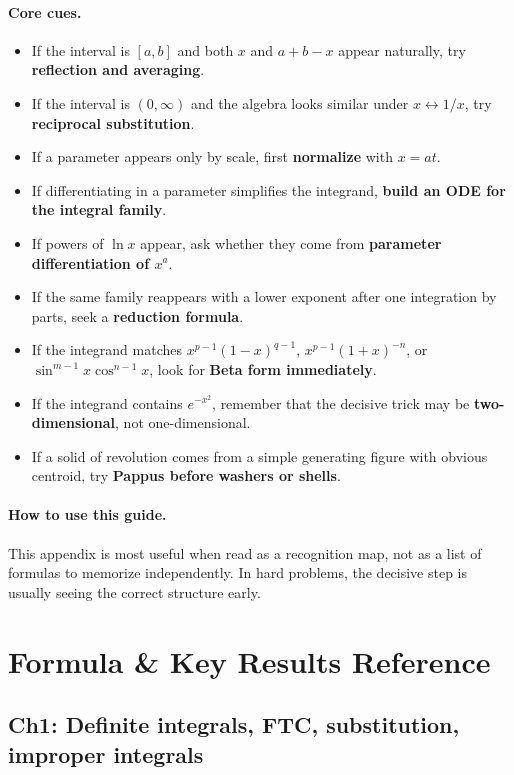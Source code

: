 \documentclass[12pt]{article}
\begin{document}
\paragraph{Core cues.}
\begin{itemize}[leftmargin=*]
\item If the interval is \([a,b]\) and both \(x\) and \(a+b-x\) appear naturally, try \textbf{reflection and averaging}.
\item If the interval is \((0,\infty)\) and the algebra looks similar under \(x\leftrightarrow 1/x\), try \textbf{reciprocal substitution}.
\item If a parameter appears only by scale, first \textbf{normalize} with \(x=at\).
\item If differentiating in a parameter simplifies the integrand, \textbf{build an ODE for the integral family}.
\item If powers of \(\ln x\) appear, ask whether they come from \textbf{parameter differentiation of \(x^a\)}.
\item If the same family reappears with a lower exponent after one integration by parts, seek a \textbf{reduction formula}.
\item If the integrand matches \(x^{p-1}(1-x)^{q-1}\), \(x^{p-1}(1+x)^{-n}\), or \(\sin^{m-1}x\cos^{n-1}x\), look for \textbf{Beta form immediately}.
\item If the integrand contains \(e^{-x^2}\), remember that the decisive trick may be \textbf{two-dimensional}, not one-dimensional.
\item If a solid of revolution comes from a simple generating figure with obvious centroid, try \textbf{Pappus before washers or shells}.
\end{itemize}

\paragraph{How to use this guide.}
This appendix is most useful when read as a recognition map, not as a list of formulas to memorize independently. In hard problems, the decisive step is usually seeing the correct structure early.
\newpage
\section{Formula \& Key Results Reference}

\subsection{Ch1: Definite integrals, FTC, substitution, improper integrals}
\end{document}
